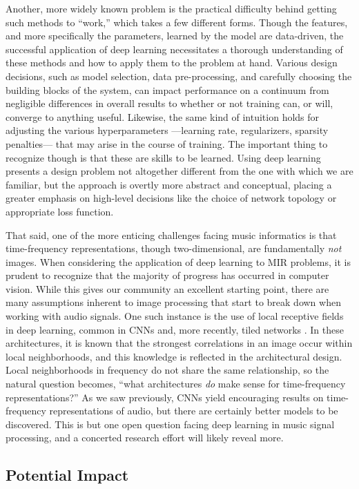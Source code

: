 Another, more widely known problem is the practical difficulty behind getting such methods to ``work,'' which takes a few different forms.
Though the features, and more specifically the parameters, learned by the model are data-driven, the successful application of deep learning necessitates a thorough understanding of these methods and how to apply them to the problem at hand.
Various design decisions, such as model selection, data pre-processing, and carefully choosing the building blocks of the system, can impact performance on a continuum from negligible differences in overall results to whether or not training can, or will, converge to anything useful.
Likewise, the same kind of intuition holds for adjusting the various hyperparameters ---learning rate, regularizers, sparsity penalties--- that may arise in the course of training.
The important thing to recognize though is that these are skills to be learned.
Using deep learning presents a design problem not altogether different from the one with which we are familiar, but the approach is overtly more abstract and conceptual, placing a greater emphasis on high-level decisions like the choice of network topology or appropriate loss function.

That said, one of the more enticing challenges facing music informatics is that time-frequency representations, though two-dimensional, are fundamentally \emph{not} images.
When considering the application of deep learning to MIR problems, it is prudent to recognize that the majority of progress has occurred in computer vision.
While this gives our community an excellent starting point, there are many assumptions inherent to image processing that start to break down when working with audio signals.
One such instance is the use of local receptive fields in deep learning, common in CNNs and, more recently, tiled networks \cite{Le2010}.
In these architectures, it is known that the strongest correlations in an image occur within local neighborhoods, and this knowledge is reflected in the architectural design.
Local neighborhoods in frequency do not share the same relationship, so the natural question becomes, ``what architectures \emph{do} make sense for time-frequency representations?''
As we saw previously, CNNs yield encouraging results on time-frequency representations of audio, but there are certainly better models to be discovered.
This is but one open question facing deep learning in music signal processing, and a concerted research effort will likely reveal more.


\subsection{Potential Impact}


